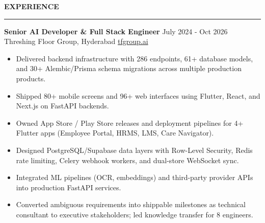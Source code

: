 \documentclass{resume}
\renewenvironment{rSection}[1]{
    \vspace{8pt}
    \noindent
    {\bfseries\MakeUppercase{#1}}
    \par
    \vspace{-3.5pt}
    \noindent\rule{\textwidth}{0.4pt}
    \par
    \vspace{4pt}
}{
    \vspace{3pt}
}
\begin{document}
\sloppy


\begin{rSection}{EXPERIENCE}

\textbf{Senior AI Developer \& Full Stack Engineer}
\hfill July 2024 - Oct 2026 \\
Threshing Floor Group, Hyderabad
\hfill \href{https://tfgroup.ai/en}{tfgroup.ai}

\vspace{-2pt}

\begin{itemize}
    \item Delivered backend infrastructure with 286 endpoints, 61+ database models, and 30+ Alembic/Prisma schema migrations across multiple production products. %
    \item Shipped 80+ mobile screens and 96+ web interfaces using Flutter, React, and Next.js on FastAPI backends.
    \item Owned App Store / Play Store releases and deployment pipelines for 4+ Flutter apps (Employee Portal, HRMS, LMS, Care Navigator).
    \item Designed PostgreSQL/Supabase data layers with Row-Level Security, Redis rate limiting, Celery webhook workers, and dual-store WebSocket sync.
    \item Integrated ML pipelines (OCR, embeddings) and third-party provider APIs into production FastAPI services.
    \item Converted ambiguous requirements into shippable milestones as technical consultant to executive stakeholders; led knowledge transfer for 8 engineers.
\end{itemize}

\end{rSection}
\end{document}
